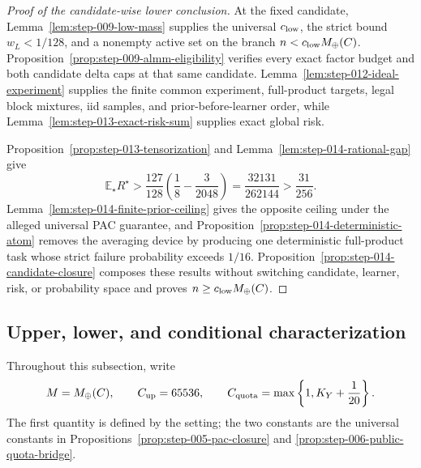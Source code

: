\begin{proof}[Proof of the candidate-wise lower conclusion]
At the fixed candidate, Lemma~\ref{lem:step-009-low-mass} supplies the
universal \(c_{\rm low}\), the strict bound \(w_L<1/128\), and a
nonempty active set on the branch
\(n<c_{\rm low}M_{\oplus}(C)\).
Proposition~\ref{prop:step-009-almm-eligibility} verifies every exact
factor budget and both candidate delta caps at that same candidate.
Lemma~\ref{lem:step-012-ideal-experiment} supplies the finite common
experiment, full-product targets, legal block mixtures, iid samples,
and prior-before-learner order, while
Lemma~\ref{lem:step-013-exact-risk-sum} supplies exact global risk.

Proposition~\ref{prop:step-013-tensorization} and
Lemma~\ref{lem:step-014-rational-gap} give
\begin{equation}\label{eq:step-014-assembled-gap}
\mathbb E_\star R^\star
>\frac{127}{128}
  \left(\frac18-\frac3{2048}\right)
=\frac{32131}{262144}
>\frac{31}{256}.
\end{equation}
Lemma~\ref{lem:step-014-finite-prior-ceiling} gives the opposite
ceiling under the alleged universal PAC guarantee, and
Proposition~\ref{prop:step-014-deterministic-atom} removes the averaging
device by producing one deterministic full-product task whose strict
failure probability exceeds \(1/16\).
Proposition~\ref{prop:step-014-candidate-closure} composes these results
without switching candidate, learner, risk, or probability space and
proves \(n\ge c_{\rm low}M_{\oplus}(C)\).
\end{proof}

\subsection{Upper, lower, and conditional characterization}
\label{app:step-015}

Throughout this subsection, write
\begin{equation}\label{eq:step-015-public-constants}
M=M_{\oplus}(C),
\qquad
C_{\rm up}=65536,
\qquad
C_{\rm quota}=\max\left\{1,K_Y+\frac1{20}\right\}.
\end{equation}
The first quantity is defined by the setting; the two constants are
the universal constants in
Propositions~\ref{prop:step-005-pac-closure} and
\ref{prop:step-006-public-quota-bridge}.

